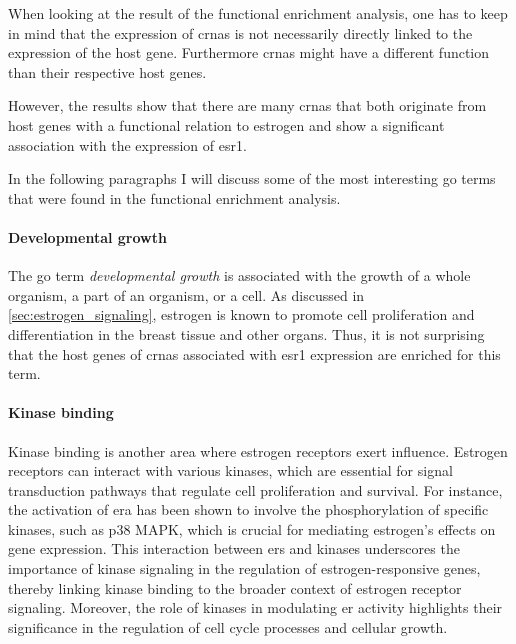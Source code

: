 When looking at the result of the functional enrichment analysis, one has to
keep in mind that the expression of \glspl{crna} is not necessarily directly
linked to the expression of the host gene.
Furthermore \glspl{crna} might have a different function than their respective
host genes.

However, the results show that there are many \glspl{crna} that both originate
from host genes with a functional relation to estrogen and show a significant
association with the expression of \gls{esr1}.

In the following paragraphs I will discuss some of the most interesting
\gls{go} terms that were found in the functional enrichment analysis.

\paragraph{Developmental growth}
The \gls{go} term \textit{developmental growth} is associated with the growth
of a whole organism, a part of an organism, or a
cell\supercite{noauthor_quickgodevelopmental_nodate,binns_quickgo_2009}.
As discussed in \cref{sec:estrogen_signaling}, estrogen is known to promote
cell proliferation and differentiation in the breast tissue and other organs.
Thus, it is not surprising that the host genes of \glspl{crna} associated with
\gls{esr1} expression are enriched for this term.

\paragraph{Kinase binding}
Kinase binding is another area where estrogen receptors exert influence.
Estrogen receptors can interact with various kinases, which are essential for
signal transduction pathways that regulate cell proliferation and survival.
For instance, the activation of \gls{era} has been shown to involve the
phosphorylation of specific kinases, such as p38 MAPK, which is crucial for
mediating estrogen's effects on gene expression\supercite{lee_regulation_2002}.
This interaction between \glspl{er} and kinases underscores the importance of
kinase signaling in the regulation of estrogen-responsive genes, thereby
linking kinase binding to the broader context of estrogen receptor
signaling\supercite{campbell_phosphatidylinositol_2001}.
Moreover, the role of kinases in modulating \gls{er} activity highlights their
significance in the regulation of cell cycle processes and cellular
growth\supercite{lu_regulation_2003}.

